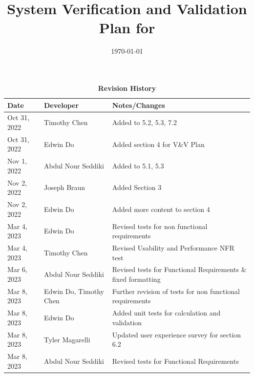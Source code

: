 \documentclass[12pt, titlepage]{article}
\begin{document}
\title{System Verification and Validation Plan for \progname{}} 
\author{\authname}
\date{\today}
	
\maketitle


\begin{table}[H]
  \caption{\bf Revision History}
  \begin{tabularx}{\textwidth}{p{2.5cm}p{2.5cm}X}
  \toprule {\bf Date} & {\bf Developer} & {\bf Notes/Changes}\\
  \midrule
  Oct 31, 2022 & Timothy Chen & Added to 5.2, 5.3, 7.2\\
  Oct 31, 2022 & Edwin Do & Added section 4 for V\&V Plan\\
  Nov 1, 2022 & Abdul Nour Seddiki & Added to 5.1, 5.3\\
  Nov 2, 2022 & Joseph Braun & Added Section 3\\
  Nov 2, 2022 & Edwin Do & Added more content to section 4 \\
  Mar 4, 2023 & Edwin Do & Revised tests for non functional requirements\\
  Mar 4, 2023 & Timothy Chen & Revised Usability and Performance NFR test\\
  Mar 6, 2023 & Abdul Nour Seddiki & Revised tests for Functional Requirements \& fixed formatting\\
  Mar 8, 2023 & Edwin Do, Timothy Chen & Further revision of tests for non functional requirements\\
  Mar 8, 2023 & Edwin Do & Added unit tests for calculation and validation\\
  Mar 8, 2023 & Tyler Magarelli & Updated user experience survey for section 6.2\\
  Mar 8, 2023 & Abdul Nour Seddiki & Revised tests for Functional Requirements\\
  \bottomrule
  \end{tabularx}
  \end{table}
  

\newpage

\tableofcontents

\listoftables


\newpage
\end{document}
